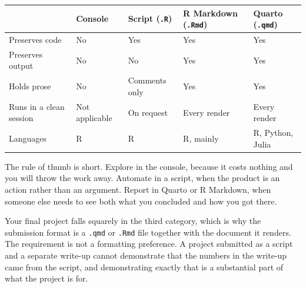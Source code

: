 \documentclass[
  a4paper,
]{scrbook}
\newcounter{none} %
\begin{document}

{\def\LTcaptype{none} %
\begin{longtable}[]{@{}
  >{\raggedright\arraybackslash}p{}
  >{\raggedright\arraybackslash}p{}
  >{\raggedright\arraybackslash}p{}
  >{\raggedright\arraybackslash}p{}
  >{\raggedright\arraybackslash}p{}@{}}
\toprule\noalign{}
\begin{minipage}[b]{\linewidth}\raggedright
\end{minipage} & \begin{minipage}[b]{\linewidth}\raggedright
Console
\end{minipage} & \begin{minipage}[b]{\linewidth}\raggedright
Script (\texttt{.R})
\end{minipage} & \begin{minipage}[b]{\linewidth}\raggedright
R Markdown (\texttt{.Rmd})
\end{minipage} & \begin{minipage}[b]{\linewidth}\raggedright
Quarto (\texttt{.qmd})
\end{minipage} \\
\midrule\noalign{}
\endhead
\bottomrule\noalign{}
\endlastfoot
Preserves code & No & Yes & Yes & Yes \\
Preserves output & No & No & Yes & Yes \\
Holds prose & No & Comments only & Yes & Yes \\
Runs in a clean session & Not applicable & On request & Every render &
Every render \\
Languages & R & R & R, mainly & R, Python, Julia \\
\end{longtable}
}

The rule of thumb is short. Explore in the console, because it costs
nothing and you will throw the work away. Automate in a script, when the
product is an action rather than an argument. Report in Quarto or R
Markdown, when someone else needs to see both what you concluded and how
you got there.

Your final project falls squarely in the third category, which is why
the submission format is a \texttt{.qmd} or \texttt{.Rmd} file together
with the document it renders. The requirement is not a formatting
preference. A project submitted as a script and a separate write-up
cannot demonstrate that the numbers in the write-up came from the
script, and demonstrating exactly that is a substantial part of what the
project is for.
\end{document}
